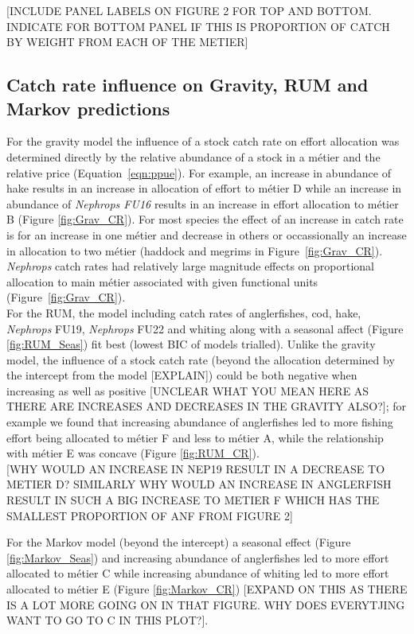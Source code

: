 \documentclass[12pt, halfline, a4paper]{ouparticle}
\begin{document}
[INCLUDE PANEL LABELS ON FIGURE 2 FOR TOP AND BOTTOM. INDICATE FOR BOTTOM PANEL IF THIS IS PROPORTION OF CATCH BY WEIGHT FROM EACH OF THE METIER]

\subsection{Catch rate influence on Gravity, RUM and Markov predictions}

For the gravity model the influence of a stock catch rate on effort allocation
was determined directly by the relative abundance of a stock in a métier and
the relative price (Equation~\ref{eqn:ppue}). For example, an increase in abundance of hake results in an
increase in allocation of effort to métier D while an increase in abundance of
\textit{Nephrops FU16} results in an increase in effort allocation to métier B
(Figure \ref{fig:Grav_CR}). For most species the effect of an increase in catch rate is for an increase in one métier and decrease in others or occassionally an increase in allocation to two métier (haddock and megrims in Figure~\ref{fig:Grav_CR}). \textit{Nephrops} catch rates had relatively large magnitude effects on proportional allocation to main métier associated with given functional units (Figure~\ref{fig:Grav_CR}). \\

For the RUM, the model including catch rates of anglerfishes,
cod, hake, \textit{Nephrops} FU19, \textit{Nephrops} FU22 and whiting along
with a seasonal affect (Figure \ref{fig:RUM_Seas}) fit best (lowest BIC of models trialled). Unlike the gravity
model, the influence of a stock catch rate (beyond the allocation determined by
the intercept from the model [EXPLAIN]) could be both negative when increasing as well as
positive [UNCLEAR WHAT YOU MEAN HERE AS THERE ARE INCREASES AND DECREASES IN THE GRAVITY ALSO?]; for example we found that increasing abundance of anglerfishes led to
more fishing effort being allocated to métier F and less to métier A, while the
relationship with métier E was concave (Figure \ref{fig:RUM_CR}). \\

[WHY WOULD AN INCREASE IN NEP19 RESULT IN A DECREASE TO METIER D? SIMILARLY WHY WOULD AN INCREASE IN ANGLERFISH RESULT IN SUCH A BIG INCREASE TO METIER F WHICH HAS THE SMALLEST PROPORTION OF ANF FROM FIGURE 2]


For the Markov model (beyond the intercept) a seasonal effect (Figure
\ref{fig:Markov_Seas}) and increasing abundance of anglerfishes led to more
effort allocated to métier C while increasing abundance of whiting led to more
effort allocated to métier E (Figure \ref{fig:Markov_CR}) [EXPAND ON THIS AS THERE IS A LOT MORE GOING ON IN THAT FIGURE. WHY DOES EVERYTJING WANT TO GO TO C IN THIS PLOT?].
\end{document}

